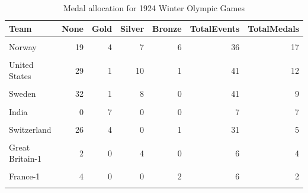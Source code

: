 \documentclass[
]{article}
\begin{document}
\begin{table}[H]
\centering
\caption{\label{tab:WinterBreakDownWinners1}Medal allocation for 1924 Winter Olympic Games}
\centering
\fontsize{7}{9}\selectfont
\begin{tabular}[t]{lrrrrrr}
\toprule
Team & None & Gold & Silver & Bronze & TotalEvents & TotalMedals\\
\midrule
\cellcolor{gray!10}{Great Britain} & \cellcolor{gray!10}{11} & \cellcolor{gray!10}{16} & \cellcolor{gray!10}{0} & \cellcolor{gray!10}{11} & \cellcolor{gray!10}{38} & \cellcolor{gray!10}{27}\\
Norway & 19 & 4 & 7 & 6 & 36 & 17\\
\cellcolor{gray!10}{Finland} & \cellcolor{gray!10}{18} & \cellcolor{gray!10}{4} & \cellcolor{gray!10}{8} & \cellcolor{gray!10}{3} & \cellcolor{gray!10}{33} & \cellcolor{gray!10}{15}\\
United States & 29 & 1 & 10 & 1 & 41 & 12\\
\cellcolor{gray!10}{Canada} & \cellcolor{gray!10}{8} & \cellcolor{gray!10}{9} & \cellcolor{gray!10}{0} & \cellcolor{gray!10}{0} & \cellcolor{gray!10}{17} & \cellcolor{gray!10}{9}\\
\addlinespace
Sweden & 32 & 1 & 8 & 0 & 41 & 9\\
\cellcolor{gray!10}{France} & \cellcolor{gray!10}{48} & \cellcolor{gray!10}{0} & \cellcolor{gray!10}{0} & \cellcolor{gray!10}{8} & \cellcolor{gray!10}{56} & \cellcolor{gray!10}{8}\\
India & 0 & 7 & 0 & 0 & 7 & 7\\
\cellcolor{gray!10}{Belgium-1} & \cellcolor{gray!10}{0} & \cellcolor{gray!10}{0} & \cellcolor{gray!10}{0} & \cellcolor{gray!10}{5} & \cellcolor{gray!10}{5} & \cellcolor{gray!10}{5}\\
Switzerland & 26 & 4 & 0 & 1 & 31 & 5\\
\addlinespace
\cellcolor{gray!10}{Austria} & \cellcolor{gray!10}{0} & \cellcolor{gray!10}{3} & \cellcolor{gray!10}{1} & \cellcolor{gray!10}{0} & \cellcolor{gray!10}{4} & \cellcolor{gray!10}{4}\\
Great Britain-1 & 2 & 0 & 4 & 0 & 6 & 4\\
\cellcolor{gray!10}{Switzerland-1} & \cellcolor{gray!10}{0} & \cellcolor{gray!10}{4} & \cellcolor{gray!10}{0} & \cellcolor{gray!10}{0} & \cellcolor{gray!10}{4} & \cellcolor{gray!10}{4}\\
France-1 & 4 & 0 & 0 & 2 & 6 & 2\\
\cellcolor{gray!10}{Australia} & \cellcolor{gray!10}{0} & \cellcolor{gray!10}{1} & \cellcolor{gray!10}{0} & \cellcolor{gray!10}{0} & \cellcolor{gray!10}{1} & \cellcolor{gray!10}{1}\\

\end{tabular}
\end{table}
\end{document}
